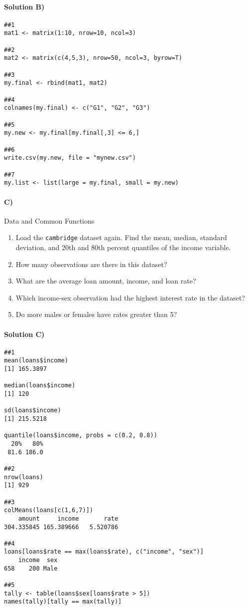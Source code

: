\documentclass[10pt]{article}
\begin{document}
\paragraph{Solution B)}
\begin{verbatim}
##1
mat1 <- matrix(1:10, nrow=10, ncol=3)

##2
mat2 <- matrix(c(4,5,3), nrow=50, ncol=3, byrow=T)

##3
my.final <- rbind(mat1, mat2)

##4
colnames(my.final) <- c("G1", "G2", "G3")

##5
my.new <- my.final[my.final[,3] <= 6,]

##6
write.csv(my.new, file = "mynew.csv")

##7
my.list <- list(large = my.final, small = my.new)
\end{verbatim}


\paragraph{C)} Data and Common Functions

\begin{enumerate}
\item Load the \texttt{cambridge} dataset again. Find the mean, median, standard deviation, and 20th and 80th percent quantiles of the income variable.
\item How many observations are there in this dataset?
\item What are the average loan amount, income, and loan rate?
\item Which income-sex observation had the highest interest rate in the dataset?
\item Do more males or females have rates greater than 5?
\end{enumerate}

\paragraph{Solution C)}
\begin{verbatim}
##1
mean(loans$income)
[1] 165.3897

median(loans$income)
[1] 120

sd(loans$income)
[1] 215.5218

quantile(loans$income, probs = c(0.2, 0.8))
  20%   80% 
 81.6 186.0 

##2
nrow(loans)
[1] 929

##3
colMeans(loans[c(1,6,7)])
    amount     income       rate 
304.335845 165.389666   5.520786

##4
loans[loans$rate == max(loans$rate), c("income", "sex")]
    income  sex
658    200 Male

##5
tally <- table(loans$sex[loans$rate > 5])
names(tally)[tally == max(tally)]
\end{verbatim}
\end{document}
